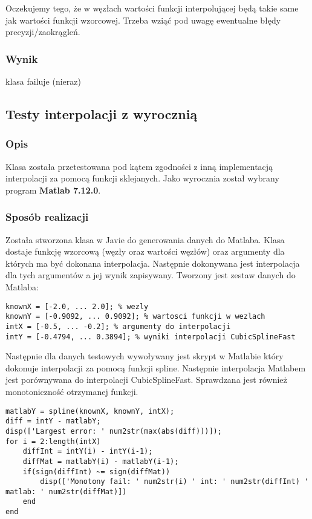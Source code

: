 \documentclass[a4paper,11pt,notitlepage]{article}
\begin{document}
Oczekujemy tego, że w węzłach wartości funkcji interpolującej będą takie same jak wartości funkcji wzorcowej. Trzeba wziąć pod uwagę ewentualne błędy precyzji/zaokrągleń.

\subsubsection{Wynik}

klasa failuje (nieraz)

\subsection{Testy interpolacji z wyrocznią}

\subsubsection{Opis}

Klasa została przetestowana pod kątem zgodności z inną implementacją interpolacji za pomocą funkcji sklejanych. Jako wyrocznia został wybrany program \textbf{Matlab 7.12.0}.

\subsubsection{Sposób realizacji}

Została stworzona klasa w Javie do generowania danych do Matlaba. Klasa dostaje funkcję wzorcową (węzły oraz wartości węzłów) oraz argumenty dla których ma być dokonana interpolacja. Następnie dokonywana jest interpolacja dla tych argumentów a jej wynik zapisywany. Tworzony jest zestaw danych do Matlaba:

\begin{lstlisting}
knownX = [-2.0, ... 2.0]; % wezly
knownY = [-0.9092, ... 0.9092]; % wartosci funkcji w wezlach
intX = [-0.5, ... -0.2]; % argumenty do interpolacji
intY = [-0.4794, ... 0.3894]; % wyniki interpolacji CubicSplineFast
\end{lstlisting}

Następnie dla danych testowych wywoływany jest skrypt w Matlabie który dokonuje interpolacji za pomocą funkcji spline. Następnie interpolacja Matlabem jest porównywana do interpolacji CubicSplineFast. Sprawdzana jest również monotoniczność otrzymanej funkcji.

\begin{lstlisting}
matlabY = spline(knownX, knownY, intX);
diff = intY - matlabY;
disp(['Largest error: ' num2str(max(abs(diff)))]);
for i = 2:length(intX)
    diffInt = intY(i) - intY(i-1);
    diffMat = matlabY(i) - matlabY(i-1);
    if(sign(diffInt) ~= sign(diffMat))
        disp(['Monotony fail: ' num2str(i) ' int: ' num2str(diffInt) ' matlab: ' num2str(diffMat)])
    end
end
\end{lstlisting}
\end{document}
